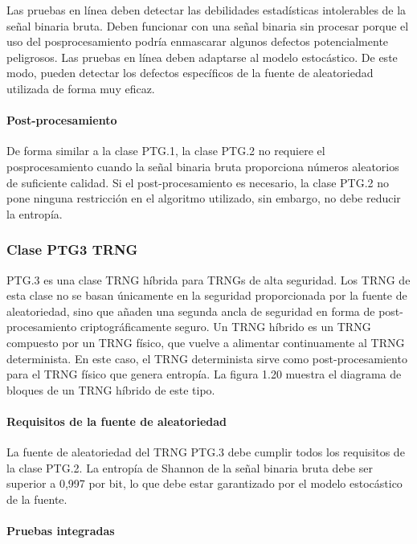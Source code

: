 			 Las pruebas en línea deben detectar las debilidades estadísticas intolerables de la señal binaria bruta. Deben funcionar con una señal binaria sin procesar porque el uso del posprocesamiento podría enmascarar algunos defectos potencialmente peligrosos. Las pruebas en línea deben adaptarse al modelo estocástico. De este modo, pueden detectar los defectos específicos de la fuente de aleatoriedad utilizada de forma muy eficaz.

		\paragraph{Post-procesamiento\\}
		
			De forma similar a la clase PTG.1, la clase PTG.2 no requiere el posprocesamiento cuando la señal binaria bruta proporciona números aleatorios de suficiente calidad. Si el post-procesamiento es necesario, la clase PTG.2 no pone ninguna restricción en el algoritmo utilizado, sin embargo, no debe reducir la entropía.
		
	
	\subsubsection{Clase PTG3 TRNG}
	
		PTG.3 es una clase TRNG híbrida para TRNGs de alta seguridad. Los TRNG de esta clase no se basan únicamente en la seguridad proporcionada por la fuente de aleatoriedad, sino que añaden una segunda ancla de seguridad en forma de post-procesamiento criptográficamente seguro. Un TRNG híbrido es un TRNG compuesto por un TRNG físico, que vuelve a alimentar continuamente al TRNG determinista. En este caso, el TRNG determinista sirve como post-procesamiento para el TRNG físico que genera entropía. La figura 1.20 muestra el diagrama de bloques de un TRNG híbrido de este tipo.
	
	\paragraph{Requisitos de la fuente de aleatoriedad\\}
	
		La fuente de aleatoriedad del TRNG PTG.3 debe cumplir todos los requisitos de la clase PTG.2. La entropía de Shannon de la señal binaria bruta debe ser superior a 0,997 por bit, lo que debe estar garantizado por el modelo estocástico de la fuente.
	\paragraph{Pruebas integradas\\}
	
